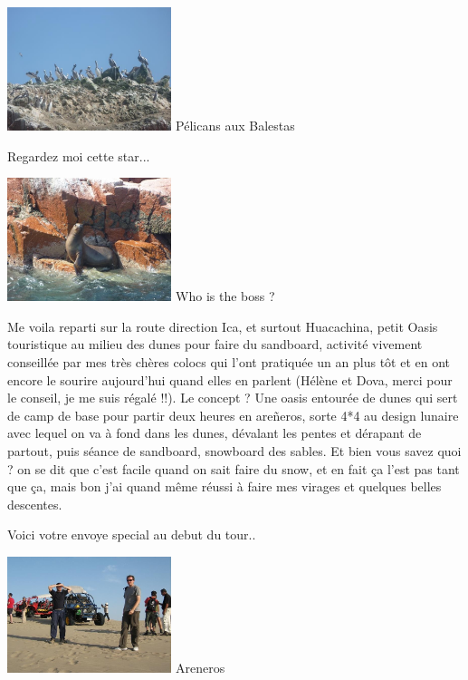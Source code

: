 \begin{multicols}{2}
\hspace*{-0.65cm}
\includegraphics[width=4.8cm]{articles/Cote-du-sud/1255997482Hoy0.jpg}
Pélicans aux Balestas


Regardez moi cette star...

\hspace*{-0.65cm}
\includegraphics[width=4.8cm]{articles/Cote-du-sud/1255997520UtdU.jpg}
Who is the boss ?


Me voila reparti sur la route direction Ica, et surtout Huacachina, petit Oasis touristique au milieu des dunes pour faire du sandboard, activité vivement conseillée par mes très chères colocs qui l'ont pratiquée un an plus tôt et en ont encore le sourire aujourd'hui quand elles en parlent (Hélène et Dova, merci pour le conseil, je me suis régalé !!). Le concept ? Une oasis entourée de dunes qui sert de camp de base pour partir deux heures en areñeros, sorte 4*4 au design lunaire avec lequel on va à fond dans les dunes, dévalant les pentes et dérapant de partout, puis séance de sandboard, snowboard des sables. Et bien vous savez quoi ? on se dit que c'est facile quand on sait faire du snow, et en fait ça l'est pas tant que ça, mais bon j'ai quand même réussi à faire mes virages et quelques belles descentes.

Voici votre envoye special au debut du tour..

\hspace*{-0.65cm}
\includegraphics[width=4.8cm]{articles/Cote-du-sud/1255997503PLr1.jpg}
Areneros



\end{multicols}
